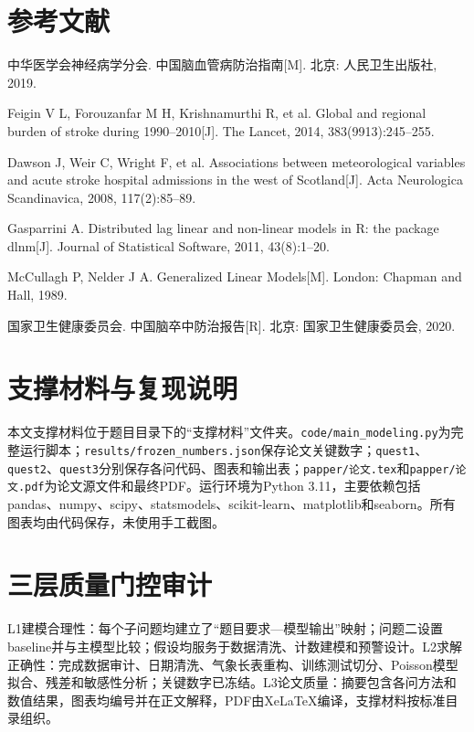 \documentclass[UTF8,a4paper,12pt]{ctexart}
\begin{document}
\section*{参考文献}
\begin{enumerate}[label={[\arabic*]}]
\item 中华医学会神经病学分会. 中国脑血管病防治指南[M]. 北京: 人民卫生出版社, 2019.
\item Feigin V L, Forouzanfar M H, Krishnamurthi R, et al. Global and regional burden of stroke during 1990--2010[J]. The Lancet, 2014, 383(9913):245--255.
\item Dawson J, Weir C, Wright F, et al. Associations between meteorological variables and acute stroke hospital admissions in the west of Scotland[J]. Acta Neurologica Scandinavica, 2008, 117(2):85--89.
\item Gasparrini A. Distributed lag linear and non-linear models in R: the package dlnm[J]. Journal of Statistical Software, 2011, 43(8):1--20.
\item McCullagh P, Nelder J A. Generalized Linear Models[M]. London: Chapman and Hall, 1989.
\item 国家卫生健康委员会. 中国脑卒中防治报告[R]. 北京: 国家卫生健康委员会, 2020.
\end{enumerate}

\appendix
\section{支撑材料与复现说明}
本文支撑材料位于题目目录下的“支撑材料”文件夹。\texttt{code/main\_modeling.py}为完整运行脚本；\texttt{results/frozen\_numbers.json}保存论文关键数字；\texttt{quest1}、\texttt{quest2}、\texttt{quest3}分别保存各问代码、图表和输出表；\texttt{papper/论文.tex}和\texttt{papper/论文.pdf}为论文源文件和最终PDF。运行环境为Python 3.11，主要依赖包括pandas、numpy、scipy、statsmodels、scikit-learn、matplotlib和seaborn。所有图表均由代码保存，未使用手工截图。
\section{三层质量门控审计}
L1建模合理性：每个子问题均建立了“题目要求—模型输出”映射；问题二设置baseline并与主模型比较；假设均服务于数据清洗、计数建模和预警设计。L2求解正确性：完成数据审计、日期清洗、气象长表重构、训练测试切分、Poisson模型拟合、残差和敏感性分析；关键数字已冻结。L3论文质量：摘要包含各问方法和数值结果，图表均编号并在正文解释，PDF由XeLaTeX编译，支撑材料按标准目录组织。
\end{document}
